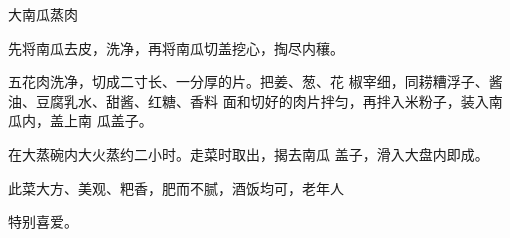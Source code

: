 \begin{recipe}[一品南瓜蒸肉]{大南瓜蒸肉}

\ingredients


\cooking

\step 先将南瓜去皮，洗净，再将南瓜切盖挖心，掏尽内穰。

\step 五花肉洗净，切成二寸长、一分厚的片。把姜、葱、花 椒宰细，同耢糟浮子、酱油、豆腐乳水、甜酱、红糖、香料 面和切好的肉片拌匀，再拌入米粉子，装入南瓜内，盖上南 瓜盖子。

\step 在大蒸碗内大火蒸约二小时。走菜时取出，揭去南瓜 盖子，滑入大盘内即成。

\notes

此菜大方、美观、粑香，肥而不腻，酒饭均可，老年人

特别喜爱。

\end{recipe}

